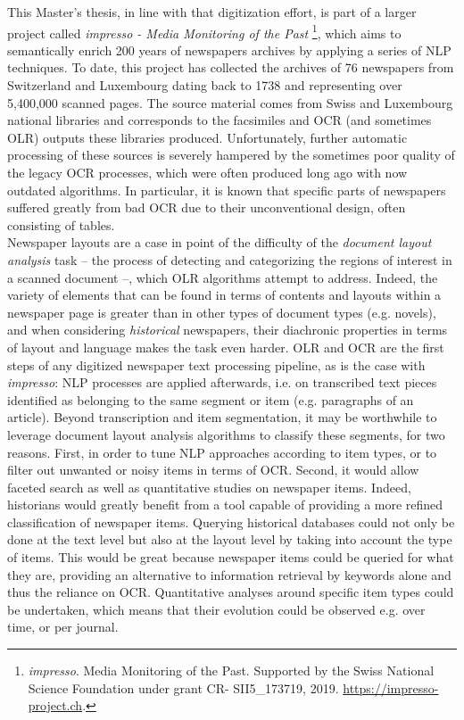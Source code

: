 This Master's thesis, in line with that digitization effort, is part of a larger project called \textit{impresso - Media Monitoring of the Past} \footnote{\textit{impresso}. Media Monitoring of the Past. Supported by the Swiss National Science Foundation under grant CR- SII5\_173719, 2019. \url{https://impresso-project.ch}.}, which aims to semantically enrich 200 years of newspapers archives by applying a series of NLP techniques. To date, this project has collected the archives of 76 newspapers from Switzerland and Luxembourg dating back to 1738 and representing over 5,400,000 scanned pages. The source material comes from Swiss and Luxembourg national libraries and corresponds to the facsimiles and OCR (and sometimes OLR) outputs these libraries produced. Unfortunately, further automatic processing of these sources is severely hampered by the sometimes poor quality of the legacy OCR processes, which were often produced long ago with now outdated algorithms. In particular, it is known that specific parts of newspapers suffered greatly from bad OCR due to their unconventional design, often consisting of tables. \\

Newspaper layouts are a case in point of the difficulty of the \textit{document layout analysis} task -- the process of detecting and categorizing the regions of interest in a scanned document --, which OLR algorithms attempt to address. Indeed, the variety of elements that can be found in terms of contents and layouts within a newspaper page is greater than in other types of document types (e.g. novels), and when considering \textit{historical} newspapers, their diachronic properties in terms of layout and language makes the task even harder. OLR and OCR are the first steps of any digitized newspaper text processing pipeline, as is the case with \textit{impresso}: NLP processes are applied afterwards, i.e. on transcribed text pieces identified as belonging to the same segment or item (e.g. paragraphs of an article). Beyond transcription and item segmentation, it may be worthwhile to leverage document layout analysis algorithms to classify these segments, for two reasons. First, in order to tune NLP approaches according to item types, or to filter out unwanted or noisy items in terms of OCR. Second, it would allow faceted search as well as quantitative studies on newspaper items. Indeed, historians would greatly benefit from a tool capable of providing a more refined classification of newspaper items. Querying historical databases could not only be done at the text level but also at the layout level by taking into account the type of items. This would be great because newspaper items could be queried for what they are, providing an alternative to information retrieval by keywords alone and thus the reliance on OCR. Quantitative analyses around specific item types could be undertaken, which means that their evolution could be observed e.g. over time, or per journal. 

